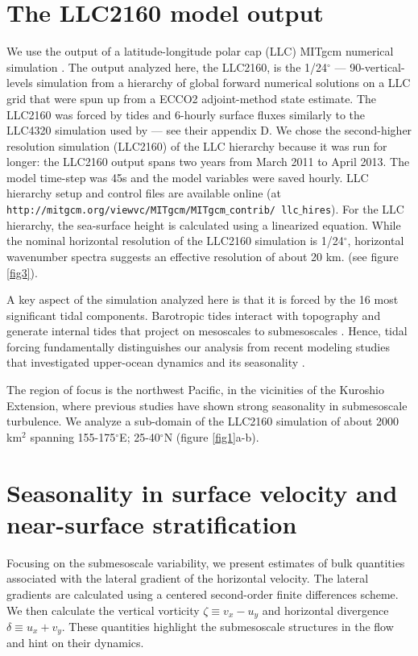 \documentclass[grl]{agutex2015}
\begin{document}
\begin{article}
\section{The LLC2160 model output}
We use the output of a latitude-longitude polar cap (LLC)
MITgcm  numerical simulation  \citep{forget_etal2015}. The output analyzed here, the LLC2160,
is the 1/24$^\circ$ --- 90-vertical-levels simulation from a hierarchy of global
forward numerical solutions on a LLC grid that were
spun up from a ECCO2 adjoint-method state estimate. The LLC2160 was forced by
tides and 6-hourly surface fluxes similarly to the LLC4320 simulation
used by \citet{rocha_etal2016} --- see their appendix D. We chose the second-higher
resolution  simulation (LLC2160) of the LLC hierarchy because it was run for longer:
the LLC2160 output spans two years from March 2011 to April 2013. The model time-step
was 45s and the model variables were saved hourly. LLC hierarchy setup
and control files are available online
(at \texttt{http://mitgcm.org/viewvc/MITgcm/MITgcm$\_$contrib/
llc$\_$hires}). For the LLC hierarchy, the sea-surface height is calculated
using a linearized equation. While the nominal horizontal resolution  of the
LLC2160 simulation is 1/24$^\circ$,
 horizontal wavenumber spectra suggests an effective resolution of about 20 km.
 (see figure \ref{fig3}).

A key aspect of the simulation analyzed here is that it is forced by
the 16 most significant tidal components.
Barotropic tides interact with topography and generate internal
tides that project on mesoscales to submesoscales
\citep{rocha_etal2016}. Hence, tidal forcing fundamentally distinguishes our analysis
from recent modeling studies that investigated upper-ocean dynamics
and its seasonality \citep{sasaki_etal2014,qiu_etal2014}.

The region of focus is the northwest Pacific, in the vicinities of the Kuroshio
Extension, where previous studies have
shown strong seasonality in submesoscale turbulence.
We analyze a sub-domain of the LLC2160 simulation of about 2000 km$^2$
spanning 155-175$^\circ$E; 25-40$^\circ$N (figure \ref{fig1}a-b).

\section{Seasonality in surface velocity and near-surface stratification}

Focusing on the submesoscale variability, we present estimates of bulk quantities
associated with the lateral gradient of the horizontal velocity.
The lateral gradients are calculated using a centered
second-order finite differences scheme. We then calculate
the vertical vorticity $\zeta \equiv v_x - u_y$ and
horizontal divergence $\delta \equiv u_x + v_y$.
These quantities highlight the submesoscale structures in the flow
and hint on their dynamics.


\end{article}
\end{document}
